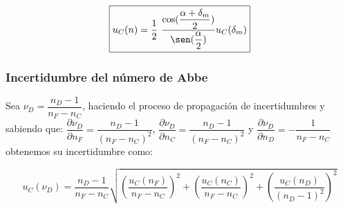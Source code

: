 \documentclass[10pt,onecolumn]{article}
\begin{document}
\begin{equation}
    \boxed{u_C(n) = \dfrac{1}{2}\ \dfrac{\cos(\dfrac{\alpha + \delta_m}{2})}{\sen(\dfrac{\alpha}{2})} u_C(\delta_m)}
\end{equation}

\subsubsection{Incertidumbre del número de Abbe}
Sea $\nu_D = \dfrac{n_D - 1}{n_F - n_C}$, haciendo el proceso de propagación de incertidumbres 
y sabiendo que: 
$\dfrac{\partial \nu_D}{\partial n_F} = \dfrac{n_D - 1}{(n_F - n_C)^2}$, $\dfrac{\partial \nu_D}{\partial n_C} = \dfrac{n_D - 1}{(n_F - n_C)^2}$ y $\dfrac{\partial \nu_D}{\partial n_D} = -\dfrac{1}{n_F - n_C}$ obtenemos su incertidumbre como:

\begin{equation}
    \boxed{u_C(\nu_D) =\dfrac{n_D - 1}{n_F - n_C} \sqrt{\left(\dfrac{u_C(n_F)}{n_F - n_C} \right)^2 + \left(\dfrac{u_C(n_C)}{n_F - n_C} \right)^2 + \left(\dfrac{u_C(n_D)}{(n_D - 1)^2} \right)^2}}
\end{equation}


\end{document}

